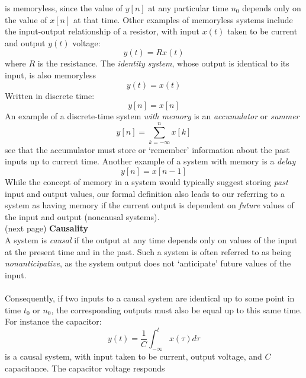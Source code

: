 \documentclass{report}
\begin{document}
is memoryless, since the value of $y[n]$ at any particular time $n_0$ depends only on the value of $x[n]$ at that time. 
Other examples of memoryless systems include the input-output relationship of a resistor, with input $x(t)$ taken to be 
current and output $y(t)$ voltage:
\begin{equation*}
y(t)=Rx(t)
\end{equation*}
where $R$ is the resistance. The \textit{identity system}, whose output is identical to its input, is also memoryless
\begin{equation*}
y(t)=x(t)
\end{equation*}
Written in discrete time:
\begin{equation*}
y[n]=x[n]
\end{equation*}
An example of a discrete-time system \textit{with memory} is an \textit{accumulator} or \textit{summer}
\begin{equation*}
y[n]=\sum^n_{k=-\infty}x[k]
\end{equation*}
see that the accumulator must store or `remember' information about the past inputs up to current time. Another example
of a system with memory is a \textit{delay}
\begin{equation*}
y[n]=x[n-1]
\end{equation*}
While the concept of memory in a system would typically suggest storing \textit{past} input and output values, our formal
definition also leads to our referring to a system as having
memory if the current output is dependent on \textit{future} values of the input and output (noncausal systems).\\
(next page)\newpage
\noindent\textbf{Causality}\\
A system is \textit{causal} if the output at any time depends only on values of the input at the present time and in the past.
Such a system is often referred to as being \textit{nonanticipative}, as the system output does not `anticipate' future values
of the input.\\
\vspace{1mm}\\
Consequently, if two inputs to a causal system are identical up to some point in time $t_0$ or $n_0$, the corresponding outputs
must also be equal up to this same time. For instance the capacitor:
\begin{equation*}
y(t)=\frac{1}{C}\int^t_{-\infty}x(\tau)d\tau
\end{equation*}
is a causal system, with input taken to be current, output voltage, and $C$ capacitance. The capacitor voltage responds
\end{document}
